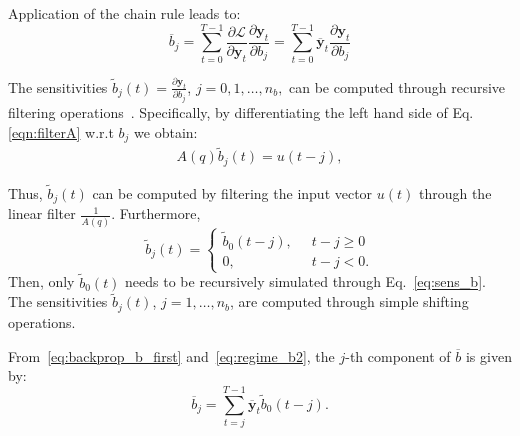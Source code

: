 \documentclass{article}
\newcommand{\q}{q} %
\newcommand{\A}{A} %
\newcommand{\bb}{b} %
\newcommand{\sens}[1]{\tilde{#1}}
\newcommand{\adjoint}[1]{\overline{#1}}
\newcommand{\tvec}[1]{\mathbf{#1}}
\newcommand{\nsamp}{T}
\newcommand{\pdiff}[2]{\frac{\partial #1}{\partial #2}}
\newcommand{\loss}{\mathcal{L}}
\begin{document}
Application of the chain rule leads to:
\begin{equation}
\label{eq:backprop_b_first}
\adjoint{\bb}_j = \sum_{t=0}^{\nsamp-1} \pdiff{\loss}{\tvec{y}_t} \pdiff{\tvec{y}_t}{\bb_j} = \sum_{t=0}^{\nsamp-1} \adjoint{\tvec{y}}_t \pdiff{\tvec{y}_t}{b_j}
\end{equation}

The  sensitivities  $\sens{\bb}_j(t)  = \pdiff{\tvec{y}_t}{b_j}$, $j=0,1,\dots,n_\bb,$ can be computed through recursive filtering operations~\cite{ljung:1999system}. Specifically,  by differentiating 
the left  hand side of Eq. \eqref{eqn:filterA} w.r.t $\bb_j$ we obtain:
\begin{align}  \label{eq:sens_b}
\A(\q) \sens{\bb}_j(t)  = u(t-j),
\end{align}

Thus, $\sens{\bb}_j(t)$ can be computed by filtering the input vector $u(t)$  through the linear filter $ \displaystyle \frac{1}{\A(\q)}$. Furthermore, 
\begin{equation}
\label{eq:regime_b2}
\sens{\bb}_{j}(t) = \begin{cases}
\sens{\bb}_0(t-j), \;\;&t-j \geq 0\\
0,           \;\; & t-j < 0.
\end{cases}
\end{equation}
Then,  only $ \sens{\bb}_0(t)$ needs to be recursively simulated through Eq.~\eqref{eq:sens_b}. The  sensitivities $ \sens{\bb}_j(t)$, $j=1,\ldots,n_\bb$, are  computed  through simple shifting operations. %

From~\eqref{eq:backprop_b_first} and~\eqref{eq:regime_b2}, the $j$-th component of $\adjoint{\bb}$ is given by:
\begin{equation}
\label{eq:backprop_b_last}
\adjoint{\bb}_j = \sum_{t=j}^{\nsamp-1} \adjoint{\tvec{y}}_t \sens{b}_0(t-j).
\end{equation}
\end{document}
